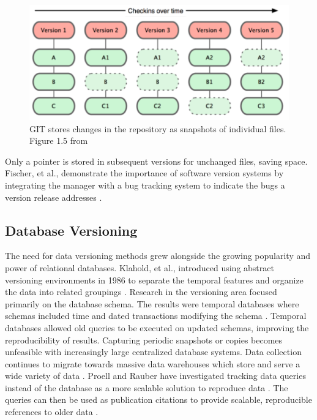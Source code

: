 \begin{figure}
	\centering
	\includegraphics[scale=0.50]{figures/GITFiles.png}
	\caption[GIT stores changes in the repository as snapshots of individual files.]{GIT stores changes in the repository as snapshots of individual files. Figure 1.5 from \cite{Chacon:2009:PG:1618548}}
	\label{GITFile}
\end{figure}
Only a pointer is stored in subsequent versions for unchanged files, saving space.
Fischer, et al., demonstrate the importance of software version systems by integrating the manager with a bug tracking system to indicate the bugs a version release addresses \cite{Fischer2003}.

\subsection{Database Versioning}

The need for data versioning methods grew alongside the growing popularity and power of relational databases.
Klahold, et al., introduced using abstract versioning environments in 1986 to separate the temporal features and organize the data into related groupings \cite{Klahold:1986:GMV:645913.671314}.
Research in the versioning area focused primarily on the database schema.
The results were temporal databases where schemas included time and dated transactions modifying the schema \cite{roddick1996model}.
Temporal databases allowed old queries to be executed on updated schemas, improving the reproducibility of results.
Capturing periodic snapshots or copies becomes unfeasible with increasingly large centralized database systems.
Data collection continues to migrate towards massive data warehouses which store and serve a wide variety of data \cite{Vassiliadis1999}.
Proell and Rauber have investigated tracking data queries instead of the database as a more scalable solution to reproduce data \cite{proellBigData}.
The queries can then be used as publication citations to provide scalable, reproducible references to older data \cite{Proell2013} \cite{DBLP:conf/data/2013}.

